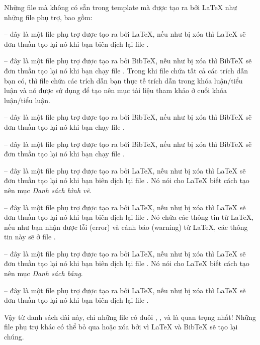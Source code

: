 Những file mà không có sẵn trong template mà được tạo ra bởi \LaTeX{} như những file phụ trợ, bao gồm:

 -- đây là một file phụ trợ được tạo ra bởi \LaTeX{}, nếu như bị xóa thì \LaTeX{} sẽ đơn thuần tạo lại nó khi bạn biên dịch lại file .

 -- đây là một file phụ trợ được tạo ra bởi BibTeX, nếu như bị xóa thì BibTeX sẽ đơn thuần tạo lại nó khi bạn chạy file . Trong khi file  chứa tất cả các trích dẫn bạn có, thì file  chứa các trích dẫn bạn thực tế trích dẫn trong khóa luận/tiểu luận và nó được sử dụng để tạo nên mục tài liệu tham khảo ở cuối khóa luận/tiểu luận.

 -- đây là một file phụ trợ được tạo ra bởi BibTeX, nếu như bị xóa thì BibTeX sẽ đơn thuần tạo lại nó khi bạn chạy file .

 -- đây là một file phụ trợ được tạo ra bởi BibTeX, nếu như bị xóa thì BibTeX sẽ đơn thuần tạo lại nó khi bạn chạy file .

 -- đây là một file phụ trợ được tạo ra bởi \LaTeX{}, nếu như bị xóa thì \LaTeX{} sẽ đơn thuần tạo lại nó khi bạn biên dịch lại file . Nó nói cho \LaTeX{} biết cách tạo nên mục \emph{Danh sách hình vẽ}.

 -- đây là một file phụ trợ được tạo ra bởi \LaTeX{}, nếu như bị xóa thì \LaTeX{} sẽ đơn thuần tạo lại nó khi bạn biên dịch lại file . Nó chứa các thông tin từ \LaTeX{}, nếu như bạn nhận được lỗi (error) và cảnh báo (warning) từ \LaTeX{}, các thông tin này sẽ ở file .

 -- đây là một file phụ trợ được tạo ra bởi \LaTeX{}, nếu như bị xóa thì \LaTeX{} sẽ đơn thuần tạo lại nó khi bạn biên dịch lại file . Nó nói cho \LaTeX{} biết cách tạo nên mục \emph{Danh sách bảng}.

 -- đây là một file phụ trợ được tạo ra bởi \LaTeX{}, nếu như bị xóa thì \LaTeX{} sẽ đơn thuần tạo lại nó khi bạn biên dịch lại file .

Vậy từ danh sách dài này, chỉ những file có đuôi , ,  và  là quan trọng nhất! Những file phụ trợ khác có thể bỏ qua hoặc xóa bởi vì \LaTeX{} và BibTeX sẽ tạo lại chúng.



